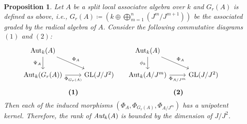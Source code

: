 \documentclass[12pt]{amsart}
\newtheorem{proposition}[theorem]{Proposition}
\theoremstyle{definition}
\numberwithin{equation}{section}
\begin{document}
\vskip2mm
\begin{proposition}\label{Proposition 4.12}
Let $A$ be a split local associatve algebra over $k$ and  $G_r(A)$ is defined as above, i.e., $G_{r}(A)\coloneq (k\oplus\bigoplus_{m=1}^{n}(J^m/J^{m+1}))$ be the associated graded by the radical algebra of $A$. Consider the following commutative diagrams $(1)$ and $(2)$:
\begin{equation}\label{eq6}
\begin{minipage}{0.45\linewidth}
\begin{tikzcd}
    \mathrm{Aut}_k(A) \arrow[dr, "\Phi_A"] \arrow[d, "\Psi_A"']\\
    \mathrm{Aut}_k(G_{r}(A)) \arrow[r,"\Phi_{G_{r}(A)}"'] & \mathrm{GL}(J/J^2)
\end{tikzcd}
\begin{center}
\textbf{(1)}
\end{center}
\end{minipage}
\begin{minipage}{0.45\linewidth}
\begin{tikzcd}
   \mathrm{Aut}_k(A) \arrow[dr, "\Phi_A"] \arrow[d, "\phi_k"']\\
    \mathrm{Aut}_k(A/J^m) \arrow[r,"\Phi_{A/J^m}"'] & \mathrm{GL}(J/J^2)
\end{tikzcd}
\begin{center}
\textbf{(2)}
\end{center}
\end{minipage}
\end{equation}
Then each of the induced morphisms $(\Phi_A, \Phi_{G_{r}(A)}, \Phi_{A/J^m})$ has a unipotent kernel. Therefore, the rank of $\emph{\text{Aut}}_k(A)$ is bounded by the dimension of $J/J^2$.
\end{proposition}
\vskip1mm
\end{document}
